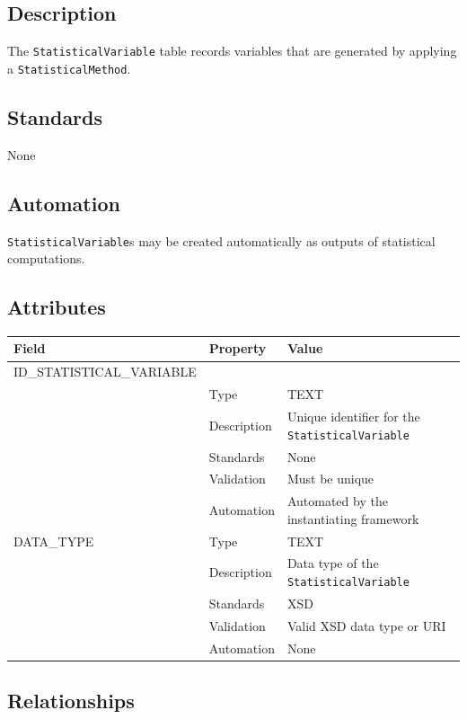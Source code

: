 \documentclass[
]{article}
\newcounter{none} %
\begin{document}
\subsection{Description}\label{description-30}

The \texttt{StatisticalVariable} table records variables that are
generated by applying a \texttt{StatisticalMethod}.

\subsection{Standards}\label{standards-32}

None

\subsection{Automation}\label{automation-32}

\texttt{StatisticalVariable}s may be created automatically as outputs of
statistical computations.

\subsection{Attributes}\label{attributes-27}

{\def\LTcaptype{none} %
\begin{longtable}[]{@{}lll@{}}
\toprule\noalign{}
Field & Property & Value \\
\midrule\noalign{}
\endhead
\bottomrule\noalign{}
\endlastfoot
ID\_STATISTICAL\_VARIABLE & & \\
& Type & TEXT \\
& Description & Unique identifier for the
\texttt{StatisticalVariable} \\
& Standards & None \\
& Validation & Must be unique \\
& Automation & Automated by the instantiating framework \\
DATA\_TYPE & Type & TEXT \\
& Description & Data type of the \texttt{StatisticalVariable} \\
& Standards & XSD \\
& Validation & Valid XSD data type or URI \\
& Automation & None \\
\end{longtable}
}

\subsection{Relationships}\label{relationships-26}
\end{document}
